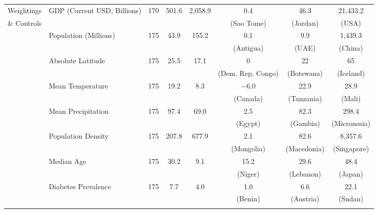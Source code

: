 \begin{table}[!htbp]
\begin{threeparttable}
\begin{tabular}{@{\extracolsep{0pt}}llcccccc}
Weightings
& GDP (Current USD, Billions) & 170 & 501.6 & 2,058.9 & 0.4 & 46.3 & 21,433.2 \\ 
\& Controls & & & & & (Sao Tome) & (Jordan) & (USA) \\
& Population (Millions)  & 175 & 43.9 & 155.2 & 0.1 & 9.9 & 1,439.3 \\ 
 & & & & & (Antigua) & (UAE) & (China) \\
& Absolute Latitude  & 175 & 25.5 & 17.1 & 0 & 22 & 65 \\ 
& & & & & (Dem. Rep. Congo) & (Botswana) & (Iceland) \\
& Mean Temperature & 175 & 19.2 & 8.3 & $-$6.0 & 22.9 & 28.9 \\ 
& & & & & (Canada) & (Tanzania) & (Mali) \\
& Mean Precipitation & 175 & 97.4 & 69.0 & 2.5 & 82.3 & 298.4 \\ 
& & & & & (Egypt) & (Gambia) & (Micronesia) \\
& Population Density & 175 & 207.8 & 677.9 & 2.1 & 82.6 & 8,357.6 \\ 
& & & & & (Mongolia) & (Macedonia) & (Singapore) \\
& Median Age & 175 & 30.2 & 9.1 & 15.2 & 29.6 & 48.4 \\ 
& & & & & (Niger) & (Lebanon) & (Japan) \\
& Diabetes Prevalence & 175 & 7.7 & 4.0 & 1.0 & 6.6 & 22.1 \\ 
& & & & & (Benin) & (Austria) & (Sudan) \\
 \hline \\[-1.8ex] 
 

\end{tabular}
\end{threeparttable}
\end{table}
